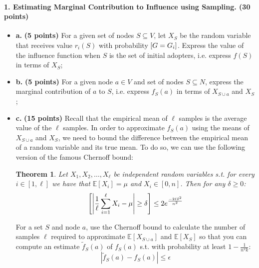 \documentclass[11pt]{article}
\let\Pr\relax
\DeclareMathOperator*{\Pr}{\mathbb{P}}
\newtheorem*{theorem*}{Theorem}
\begin{document}
	
	\paragraph{1. Estimating Marginal Contribution to Influence using Sampling. (30 points)}
	
	\begin{itemize}
		\item[] \textbf{a.} \textbf{(5 points)} For a given set of nodes $S\subseteq V$, let $X_{S}$ be the random variable that receives value $r_{i}(S)$ with probability $\Pr[G=G_i]$.  Express the value of the influence function when $S$ is the set of initial adopters, i.e. express $f(S)$ in terms of $X_{S}$;
		
		\item[] \textbf{b.} \textbf{(5 points)} For a given node $a\in V$ and set of nodes $S\subseteq N$, express the marginal contribution of $a$ to $S$, i.e. express $f_{S}(a)$ in terms of $X_{S\cup a}$ and $X_{S}$;
		
		\item[] \textbf{c.}  \textbf{(15 points)} Recall that the empirical mean of $\ell$ samples is the average value of the $\ell$ samples.  In order to approximate $f_{S}(a)$ using the means of $X_{S\cup a}$ and $X_{S}$, we need to bound the difference between the empirical mean of a random variable and its true mean.  To do so, we can use the following version of the famous Chernoff bound:
		
		\begin{theorem*}
			Let $X_{1},X_{2},\ldots,X_{\ell}$ be independent random variables s.t. for every $i\in [1, \ell]$ we have that $\mathbb{E}[X_i] = \mu$ and $X_{i} \in [0,n]$.  Then for any $\delta \geq 0$:
			$$ \Pr \left [ \left |\frac{1}{\ell} \sum_{i=1}^{\ell} X_i - \mu \right | \geq \delta \right ] \leq 2e^{\frac{-2\ell \delta^2}{n^2}}$$
		\end{theorem*}
		
		For a set $S$ and node $a$, use the Chernoff bound to calculate the number of samples $\ell$ required to approximate $\mathbb{E}[X_{S\cup a}]$ and $\mathbb{E}[X_S]$ so that you can compute an estimate $\tilde{f}_{S}(a)$ of $f_{S}(a)$ s.t. with probability at least $1-\frac{1}{n^2k}$:
		$$| \tilde{f}_{S}(a) - f_{S}(a) | \leq \epsilon$$  
		

\end{itemize}
\end{document}
